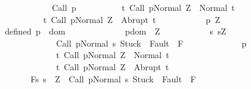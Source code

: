 \begin{isabellebody}
\ \ \ \ \ \ \ \ \ \ \ \ {\isacharparenleft}Call\ p{\isacharparenright}\isanewline
\ \ \ \ \ \ \ \ \ \ {\isacharbraceleft}t{\isachardot}\ {\isasymGamma}{\isasymturnstile}{\isasymlangle}Call\ p{\isacharcomma}Normal\ Z{\isasymrangle}\ {\isasymRightarrow}\ Normal\ t{\isacharbraceright}{\isacharcomma}\isanewline
\ \ \ \ \ \ \ \ \ \ {\isacharbraceleft}t{\isachardot}\ {\isasymGamma}{\isasymturnstile}{\isasymlangle}Call\ p{\isacharcomma}Normal\ Z{\isasymrangle}\ {\isasymRightarrow}\ Abrupt\ t{\isacharbraceright}{\isachardoublequoteclose}\isanewline
%
\isadelimproof
%
\endisadelimproof
%
\isatagproof
{}\isamarkupfalse%
\ {\isacharminus}\ \isanewline
\ \ \isacommand{{\isacharbraceleft}}\isamarkupfalse%
\isanewline
\ \ \ \ \isamarkupfalse%
\ p\ Z\ \isanewline
\ \ \ \ \isamarkupfalse%
\ defined{\isacharcolon}\ {\isachardoublequoteopen}p\ {\isasymin}\ dom\ {\isasymGamma}{\isachardoublequoteclose}\isanewline
\ \ \ \ \isamarkupfalse%
\ \isanewline
\ \ \ \ \ \ {\isachardoublequoteopen}{\isasymGamma}{\isacharcomma}{\isacharparenleft}{\isasymUnion}p{\isasymin}dom\ {\isasymGamma}{\isachardot}\ {\isasymUnion}Z{\isachardot}\ \isanewline
\ \ \ \ \ \ \ \ \ \ {\isacharbraceleft}{\isacharparenleft}{\isacharbraceleft}s{\isachardot}\ s{\isacharequal}Z\ {\isasymand}\ \isanewline
\ \ \ \ \ \ \ \ \ \ \ \ \ {\isasymGamma}{\isasymturnstile}{\isasymlangle}Call\ p{\isacharcomma}Normal\ s{\isasymrangle}\ {\isasymRightarrow}{\isasymnotin}{\isacharparenleft}{\isacharbraceleft}Stuck{\isacharbraceright}\ {\isasymunion}\ Fault\ {\isacharbackquote}\ {\isacharparenleft}{\isacharminus}F{\isacharparenright}{\isacharparenright}{\isacharbraceright}{\isacharcomma}\isanewline
\ \ \ \ \ \ \ \ \ \ \ \ \ p{\isacharcomma}\isanewline
\ \ \ \ \ \ \ \ \ \ \ \ \ {\isacharbraceleft}t{\isachardot}\ {\isasymGamma}{\isasymturnstile}{\isasymlangle}Call\ p{\isacharcomma}Normal\ Z{\isasymrangle}\ {\isasymRightarrow}\ Normal\ t{\isacharbraceright}{\isacharcomma}\isanewline
\ \ \ \ \ \ \ \ \ \ \ \ \ {\isacharbraceleft}t{\isachardot}\ {\isasymGamma}{\isasymturnstile}{\isasymlangle}Call\ p{\isacharcomma}Normal\ Z{\isasymrangle}\ {\isasymRightarrow}\ Abrupt\ t{\isacharbraceright}{\isacharparenright}{\isacharbraceright}{\isacharparenright}\isanewline
\ \ \ \ \ \ \ {\isasymturnstile}\isactrlbsub {\isacharslash}F\isactrlesub {\isacharbraceleft}s{\isachardot}\ s\ {\isacharequal}\ Z\ {\isasymand}\ {\isasymGamma}{\isasymturnstile}{\isasymlangle}Call\ p{\isacharcomma}Normal\ s{\isasymrangle}\ {\isasymRightarrow}{\isasymnotin}{\isacharparenleft}{\isacharbraceleft}Stuck{\isacharbraceright}\ {\isasymunion}\ Fault\ {\isacharbackquote}\ {\isacharparenleft}{\isacharminus}F{\isacharparenright}{\isacharparenright}{\isacharbraceright}\ \isanewline

\end{isabellebody}

